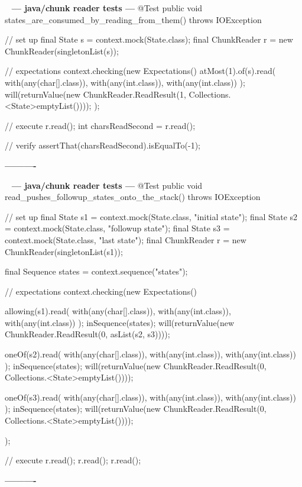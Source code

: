 \documentclass{book}
\newenvironment{chunk}[1]{%
{\ }\newline\noindent%
\hbox{\hskip 2.0cm}{\bf --- #1 ---}%
\verbatim}%                               say exactly what we see
{\endverbatim%
\par{}%
\noindent{}%
\hbox{\hskip 2.0cm}{\bf ----------}%
\par%
\normalsize\noindent}%
\begin{document}
\begin{chunk}{java/chunk reader tests}
@Test
public void states_are_consumed_by_reading_from_them() throws IOException {
    // set up
    final State s = context.mock(State.class);
    final ChunkReader r = new ChunkReader(singletonList(s));

    // expectations
    context.checking(new Expectations() {{
        atMost(1).of(s).read(
                with(any(char[].class)), 
                with(any(int.class)), 
                with(any(int.class))
        );
        will(returnValue(new ChunkReader.ReadResult(1, Collections.<State>emptyList())));
    }});

    // execute
    r.read();
    int charsReadSecond = r.read();

    // verify
    assertThat(charsReadSecond).isEqualTo(-1);
}
\end{chunk}

\begin{chunk}{java/chunk reader tests}
@Test
public void read_pushes_followup_states_onto_the_stack() throws IOException {
    // set up
    final State s1 = context.mock(State.class, "initial state");
    final State s2 = context.mock(State.class, "followup state");
    final State s3 = context.mock(State.class, "last state");
    final ChunkReader r = new ChunkReader(singletonList(s1));

    final Sequence states = context.sequence("states");

    // expectations
    context.checking(new Expectations() {{
        allowing(s1).read(
                with(any(char[].class)), 
                with(any(int.class)), 
                with(any(int.class))
        );
        inSequence(states);
        will(returnValue(new ChunkReader.ReadResult(0, asList(s2, s3))));

        oneOf(s2).read(
                with(any(char[].class)), 
                with(any(int.class)), 
                with(any(int.class))
        );
        inSequence(states);
        will(returnValue(new ChunkReader.ReadResult(0, Collections.<State>emptyList())));

        oneOf(s3).read(
                with(any(char[].class)), 
                with(any(int.class)), 
                with(any(int.class))
        );
        inSequence(states);
        will(returnValue(new ChunkReader.ReadResult(0, Collections.<State>emptyList())));
    }});

    // execute
    r.read();
    r.read();
    r.read();
}
\end{chunk}
\end{document}
